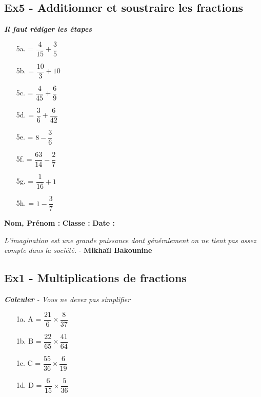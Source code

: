 \documentclass[12pt]{article}
\begin{document}
\subsection*{Ex5 - Additionner et soustraire les fractions}

\textit{\textbf{Il faut rédiger les étapes}}

\begin{multicols}{4}
  \begin{enumerate}
    \item[5a.]  = $\dfrac{4}{15} + \dfrac{3}{5}$
    \item[5b.]  = $\dfrac{10}{3} + 10$
    \item[5c.]  = $\dfrac{4}{45} + \dfrac{6}{9}$
    \item[5d.]  = $\dfrac{3}{6} + \dfrac{6}{42}$
    \item[5e.]  = $8 - \dfrac{3}{6}$
    \item[5f.]  = $\dfrac{63}{14} - \dfrac{2}{7}$
    \item[5g.]  = $\dfrac{1}{16} + 1$
    \item[5h.]  = $1 - \dfrac{3}{7}$
    \end{enumerate} 
\end{multicols}

\newpage


\textbf{Nom, Prénom :} \hspace{8cm} \textbf{Classe :} \hspace{3cm} \textbf{Date :}\\

\begin{center}
  \textit{L'imagination est une grande puissance dont généralement on ne tient pas assez compte dans la société.}  - \textbf{Mikhaïl Bakounine}
\end{center}

\subsection*{Ex1 - Multiplications de fractions}

\textit{\textbf{Calculer} - Vous ne devez pas simplifier}

\begin{multicols}{4}
  \begin{enumerate}
    \item[1a.] A = $\dfrac{21}{6} \times \dfrac{8}{37}$
    \item[1b.] B = $\dfrac{22}{65} \times \dfrac{41}{64}$
    \item[1c.] C = $\dfrac{55}{36} \times \dfrac{6}{19}$
    \item[1d.] D = $\dfrac{6}{15} \times \dfrac{5}{36}$
  \end{enumerate} 
\end{multicols}
  
\end{document}
